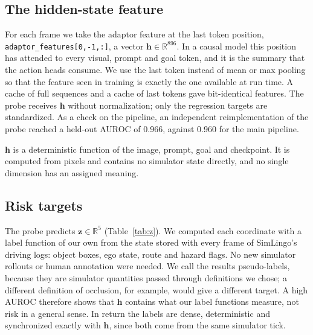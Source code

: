 \documentclass[conference]{IEEEtran}
\newcommand{\code}[1]{\texttt{\small #1}}
\begin{document}
\subsection{The hidden-state feature}

For each frame we take the adaptor feature at the last token position,
\code{adaptor\_features[0,-1,:]}, a vector $\mathbf{h}\in\mathbb{R}^{896}$. In a
causal model this position has attended to every visual, prompt and goal token, and
it is the summary that the action heads consume. We use the last token instead of
mean or max pooling so that the feature seen in training is exactly the one
available at run time. A cache of full sequences and a cache of last tokens gave
bit-identical features. The probe receives $\mathbf{h}$ without normalization;
only the regression targets are standardized. As a check on the pipeline, an
independent reimplementation of the probe reached a held-out AUROC of 0.966,
against 0.960 for the main pipeline.

$\mathbf{h}$ is a deterministic function of the image, prompt, goal and checkpoint.
It is computed from pixels and contains no simulator state directly, and no single
dimension has an assigned meaning.

\subsection{Risk targets}

The probe predicts $\mathbf{z}\in\mathbb{R}^5$ (Table~\ref{tab:z}). We computed
each coordinate with a label function of our own from the state stored with every
frame of SimLingo's driving logs: object boxes, ego state, route and hazard flags.
No new simulator rollouts or human annotation were needed. We call the results
pseudo-labels, because they are simulator quantities passed through definitions we
chose; a different definition of occlusion, for example, would give a different
target. A high AUROC therefore shows that $\mathbf{h}$ contains what our label
functions measure, not risk in a general sense. In return the labels are dense,
deterministic and synchronized exactly with $\mathbf{h}$, since both come from the
same simulator tick.
\end{document}
